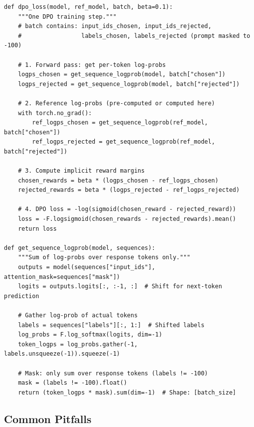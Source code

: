 \begin{examplebox}
\begin{lstlisting}[style=pythonstyle]
def dpo_loss(model, ref_model, batch, beta=0.1):
    """One DPO training step."""
    # batch contains: input_ids_chosen, input_ids_rejected,
    #                 labels_chosen, labels_rejected (prompt masked to -100)
    
    # 1. Forward pass: get per-token log-probs
    logps_chosen = get_sequence_logprob(model, batch["chosen"])
    logps_rejected = get_sequence_logprob(model, batch["rejected"])
    
    # 2. Reference log-probs (pre-computed or computed here)
    with torch.no_grad():
        ref_logps_chosen = get_sequence_logprob(ref_model, batch["chosen"])
        ref_logps_rejected = get_sequence_logprob(ref_model, batch["rejected"])
    
    # 3. Compute implicit reward margins
    chosen_rewards = beta * (logps_chosen - ref_logps_chosen)
    rejected_rewards = beta * (logps_rejected - ref_logps_rejected)
    
    # 4. DPO loss = -log(sigmoid(chosen_reward - rejected_reward))
    loss = -F.logsigmoid(chosen_rewards - rejected_rewards).mean()
    return loss

def get_sequence_logprob(model, sequences):
    """Sum of log-probs over response tokens only."""
    outputs = model(sequences["input_ids"], attention_mask=sequences["mask"])
    logits = outputs.logits[:, :-1, :]  # Shift for next-token prediction
    
    # Gather log-prob of actual tokens
    labels = sequences["labels"][:, 1:]  # Shifted labels
    log_probs = F.log_softmax(logits, dim=-1)
    token_logps = log_probs.gather(-1, labels.unsqueeze(-1)).squeeze(-1)
    
    # Mask: only sum over response tokens (labels != -100)
    mask = (labels != -100).float()
    return (token_logps * mask).sum(dim=-1)  # Shape: [batch_size]
\end{lstlisting}
\end{examplebox}

\subsection{Common Pitfalls}
\label{common-pitfalls}

